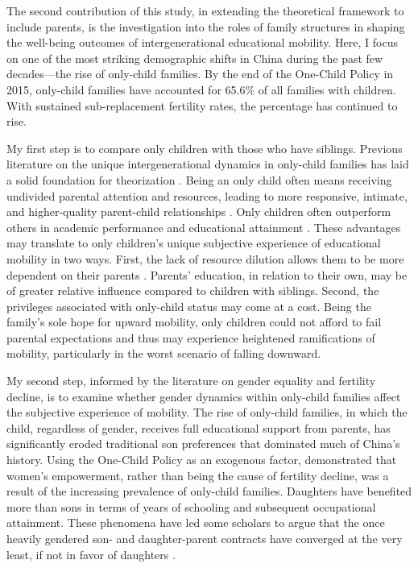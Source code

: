 The second contribution of this study, in extending the theoretical framework to include parents, is the investigation into the roles of family structures in shaping the well-being outcomes of intergenerational educational mobility. Here, I focus on one of the most striking demographic shifts in China during the past few decades—the rise of only-child families. By the end of the One-Child Policy in 2015, only-child families have accounted for 65.6\% of all families with children. With sustained sub-replacement fertility rates, the percentage has continued to rise.

My first step is to compare only children with those who have siblings. Previous literature on the unique intergenerational dynamics in only-child families has laid a solid foundation for theorization \parencite{falboQuantitativeReviewOnly1986}. Being an only child often means receiving undivided parental attention and resources, leading to more responsive, intimate, and higher-quality parent-child relationships \parencite{liuWhoBenefitsBeing2021}. Only children often outperform others in academic performance and educational attainment \parencite{falboQuantitativeReviewOnly1986}. These advantages may translate to only children's unique subjective experience of educational mobility in two ways. First, the lack of resource dilution allows them to be more dependent on their parents \parencite{liuWhoBenefitsBeing2021}. Parents' education, in relation to their own, may be of greater relative influence compared to children with siblings. Second, the privileges associated with only-child status may come at a cost. Being the family's sole hope for upward mobility, only children could not afford to fail parental expectations and thus may experience heightened ramifications of mobility, particularly in the worst scenario of falling downward.

My second step, informed by the literature on gender equality and fertility decline, is to examine whether gender dynamics within only-child families affect the subjective experience of mobility. The rise of only-child families, in which the child, regardless of gender, receives full educational support from parents, has significantly eroded traditional son preferences that dominated much of China's history. Using the One-Child Policy as an exogenous factor, \textcite{wuFertilityDeclineWomens2014} demonstrated that women's empowerment, rather than being the cause of fertility decline, was a result of the increasing prevalence of only-child families. Daughters have benefited more than sons in terms of years of schooling and subsequent occupational attainment. These phenomena have led some scholars to argue that the once heavily gendered son- and daughter-parent contracts have converged at the very least, if not in favor of daughters \parencite{fongChinasOneChildPolicy2002,guSacrificeIndebtednessIntergenerational2022,xuHopingPhoenixShanghai2013}.

